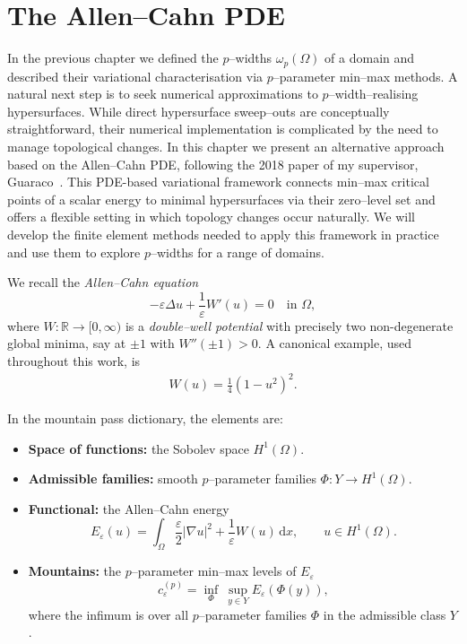 \chapter{The Allen–Cahn PDE}
\label{ch:4}
In the previous chapter we defined the $p$--widths $\omega_p(\Omega)$ of a domain and described their variational characterisation via $p$--parameter min–max methods. A natural next step is to seek numerical approximations to $p$--width–realising hypersurfaces. While direct hypersurface sweep–outs are conceptually straightforward, their numerical implementation is complicated by the need to manage topological changes. In this chapter we present an alternative approach based on the Allen--Cahn PDE, following the 2018 paper of my supervisor, Guaraco~\cite{Guaraco18}. This PDE-based variational framework connects min--max critical points of a scalar energy to minimal hypersurfaces via their zero--level set and offers a flexible setting in which topology changes occur naturally. We will develop the finite element methods needed to apply this framework in practice and use them to explore $p$--widths for a range of domains.

\noindent We recall the \emph{Allen–Cahn equation}
\begin{equation}\label{eq:allen-cahn-pde}
    -\varepsilon\Delta u+\frac{1}{\varepsilon}W'(u)=0 \quad \text{in } \Omega,
\end{equation}
where $W\colon\mathbb{R}\to[0,\infty)$ is a \emph{double–well potential} with precisely two non-degenerate global minima, say at $\pm1$ with $W''(\pm1)>0$. A canonical example, used throughout this work, is
\begin{align*}
W(u) = \frac14(1-u^2)^2.
\end{align*}

\noindent In the mountain pass dictionary, the elements are:
\begin{itemize}
    \item \textbf{Space of functions:} the Sobolev space $H^1(\Omega)$.
    \item \textbf{Admissible families:} smooth $p$–parameter families $\Phi \colon Y \to H^1(\Omega)$.
    \item \textbf{Functional:} the Allen–Cahn energy
    \begin{equation}\label{eq:allen-cahn-energy}
      E_\varepsilon(u) = \int_{\Omega} \frac{\varepsilon}{2}|\nabla u|^{2} + \frac{1}{\varepsilon} W(u) \,\mathrm{d}x, \qquad u\in H^{1}(\Omega).
    \end{equation}
    \item \textbf{Mountains:} the $p$–parameter min–max levels of $E_\varepsilon$
    \begin{equation}\label{eq:minmax-level}
        c_{\varepsilon}^{(p)} = \inf_{\Phi} \ \sup_{y \in Y} E_{\varepsilon}(\Phi(y)),
    \end{equation}
    where the infimum is over all $p$–parameter families $\Phi$ in the admissible class $Y$.
\end{itemize}

